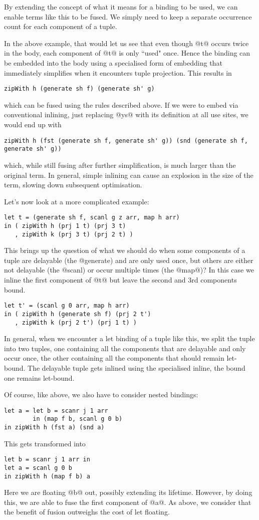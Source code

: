 By extending the concept of what it means for a binding to be used, we can enable terms like this to be fused. We simply need to keep a separate occurrence count for each component of a tuple.

In the above example, that would let us see that even though @t@ occurs twice in the body, each component of @t@ is only ``used" once. Hence the binding can be embedded into the body using a specialised form of embedding that immediately simplifies when it encounters tuple projection. This results in
%
\begin{lstlisting}
zipWith h (generate sh f) (generate sh' g)
\end{lstlisting}
%
which can be fused using the rules described above. If we were to embed via conventional inlining, just replacing @ys@ with its definition at all use sites, we would end up with
%
\begin{lstlisting}
zipWith h (fst (generate sh f, generate sh' g)) (snd (generate sh f, generate sh' g))
\end{lstlisting}
%
which, while still fusing after further simplification, is much larger than the original term. In general, simple inlining can cause an explosion in the size of the term, slowing down subsequent optimisation.

Let's now look at a more complicated example:
%
\begin{lstlisting}
let t = (generate sh f, scanl g z arr, map h arr)
in ( zipWith h (prj 1 t) (prj 3 t)
   , zipWith k (prj 3 t) (prj 2 t) )
\end{lstlisting}
%
This brings up the question of what we should do when some components of a tuple are delayable (the @generate) and are only used once, but others are either not delayable (the @scanl) or occur multiple times (the @map@)? In this case we inline the first component of @t@ but leave the second and 3rd components bound.
%
\begin{lstlisting}
let t' = (scanl g 0 arr, map h arr)
in ( zipWith h (generate sh f) (prj 2 t')
   , zipWith k (prj 2 t') (prj 1 t) )
\end{lstlisting}
%
In general, when we encounter a let binding of a tuple like this, we split the tuple into two tuples, one containing all the components that are delayable and only occur once, the other containing all the components that should remain let-bound. The delayable tuple gets inlined using the specialised inline, the bound one remains let-bound.

Of course, like above, we also have to consider nested bindings:
%
\begin{lstlisting}
let a = let b = scanr j 1 arr
        in (map f b, scanl g 0 b)
in zipWith h (fst a) (snd a)
\end{lstlisting}
%
This gets transformed into
%
\begin{lstlisting}
let b = scanr j 1 arr in
let a = scanl g 0 b
in zipWith h (map f b) a
\end{lstlisting}
%
Here we are floating @b@ out, possibly extending its lifetime. However, by doing this, we are able to fuse the first component of @a@. As above, we consider that the benefit of fusion outweighs the cost of let floating.


